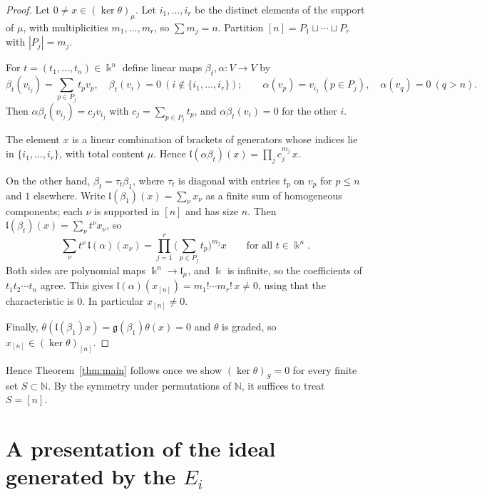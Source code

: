 \documentclass[11pt]{amsart}
\theoremstyle{definition}
\theoremstyle{remark}
\newcommand{\N}{\mathbb{N}}
\newcommand{\kk}{\Bbbk}
\newcommand{\g}{\mathfrak{g}}
\newcommand{\lie}{\mathfrak{l}}
\begin{document}
\begin{proof}
Let $0\ne x\in(\ker\theta)_\mu$. Let $i_1,\dots,i_r$ be the distinct elements of the support of $\mu$, with multiplicities $m_1,\dots,m_r$, so $\sum m_j=n$. Partition $[n]=P_1\sqcup\cdots\sqcup P_r$ with $|P_j|=m_j$.

For $t=(t_1,\dots,t_n)\in\kk^n$ define linear maps $\beta_t,\alpha\colon V\to V$ by
\[
\beta_t(v_{i_j})=\sum_{p\in P_j}t_pv_p,\quad \beta_t(v_i)=0\ (i\notin\{i_1,\dots,i_r\});\qquad
\alpha(v_p)=v_{i_j}\ (p\in P_j),\quad \alpha(v_q)=0\ (q>n).
\]
Then $\alpha\beta_t(v_{i_j})=c_jv_{i_j}$ with $c_j=\sum_{p\in P_j}t_p$, and $\alpha\beta_t(v_i)=0$ for the other $i$.

The element $x$ is a linear combination of brackets of generators whose indices lie in $\{i_1,\dots,i_r\}$, with total content $\mu$. Hence $\lie(\alpha\beta_t)(x)=\prod_jc_j^{m_j}\,x$.

On the other hand, $\beta_t=\tau_t\beta_1$, where $\tau_t$ is diagonal with entries $t_p$ on $v_p$ for $p\le n$ and $1$ elsewhere. Write $\lie(\beta_1)(x)=\sum_\nu x_\nu$ as a finite sum of homogeneous components; each $\nu$ is supported in $[n]$ and has size $n$. Then $\lie(\beta_t)(x)=\sum_\nu t^\nu x_\nu$, so
\[
\sum_\nu t^\nu\,\lie(\alpha)(x_\nu)=\prod_{j=1}^r\Big(\sum_{p\in P_j}t_p\Big)^{m_j}x\qquad\text{for all }t\in\kk^n.
\]
Both sides are polynomial maps $\kk^n\to\lie_\mu$, and $\kk$ is infinite, so the coefficients of $t_1t_2\cdots t_n$ agree. This gives $\lie(\alpha)(x_{[n]})=m_1!\cdots m_r!\,x\neq0$, using that the characteristic is $0$. In particular $x_{[n]}\neq0$.

Finally, $\theta(\lie(\beta_1)x)=\g(\beta_1)\theta(x)=0$ and $\theta$ is graded, so $x_{[n]}\in(\ker\theta)_{[n]}$.
\end{proof}

Hence Theorem~\ref{thm:main} follows once we show $(\ker\theta)_S=0$ for every finite set $S\subset\N$. By the symmetry under permutations of $\N$, it suffices to treat $S=[n]$.

\section{A presentation of the ideal generated by the \texorpdfstring{$E_i$}{E\_i}}\label{sec:k}
\end{document}
